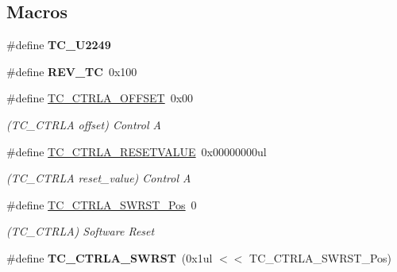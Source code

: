 \subsection*{Macros}
\begin{DoxyCompactItemize}
\item 
\hypertarget{group___s_a_m_l21___t_c_ga7ee2875f18668e775348abb0670dab7c}{}\#define {\bfseries T\+C\+\_\+\+U2249}\label{group___s_a_m_l21___t_c_ga7ee2875f18668e775348abb0670dab7c}

\item 
\hypertarget{group___s_a_m_l21___t_c_gabcc45dcc7fd74357245ffdc3e5c65cda}{}\#define {\bfseries R\+E\+V\+\_\+\+T\+C}~0x100\label{group___s_a_m_l21___t_c_gabcc45dcc7fd74357245ffdc3e5c65cda}

\item 
\hypertarget{group___s_a_m_l21___t_c_ga9eb7017b395a54f7ca9b9da83cc191e7}{}\#define \hyperlink{group___s_a_m_l21___t_c_ga9eb7017b395a54f7ca9b9da83cc191e7}{T\+C\+\_\+\+C\+T\+R\+L\+A\+\_\+\+O\+F\+F\+S\+E\+T}~0x00\label{group___s_a_m_l21___t_c_ga9eb7017b395a54f7ca9b9da83cc191e7}

\begin{DoxyCompactList}\small\item\em (T\+C\+\_\+\+C\+T\+R\+L\+A offset) Control A \end{DoxyCompactList}\item 
\hypertarget{group___s_a_m_l21___t_c_gaadad5111a08d20825cd5413ab481a673}{}\#define \hyperlink{group___s_a_m_l21___t_c_gaadad5111a08d20825cd5413ab481a673}{T\+C\+\_\+\+C\+T\+R\+L\+A\+\_\+\+R\+E\+S\+E\+T\+V\+A\+L\+U\+E}~0x00000000ul\label{group___s_a_m_l21___t_c_gaadad5111a08d20825cd5413ab481a673}

\begin{DoxyCompactList}\small\item\em (T\+C\+\_\+\+C\+T\+R\+L\+A reset\+\_\+value) Control A \end{DoxyCompactList}\item 
\hypertarget{group___s_a_m_l21___t_c_ga0724c3271e5836ea2a22432dd4fb010d}{}\#define \hyperlink{group___s_a_m_l21___t_c_ga0724c3271e5836ea2a22432dd4fb010d}{T\+C\+\_\+\+C\+T\+R\+L\+A\+\_\+\+S\+W\+R\+S\+T\+\_\+\+Pos}~0\label{group___s_a_m_l21___t_c_ga0724c3271e5836ea2a22432dd4fb010d}

\begin{DoxyCompactList}\small\item\em (T\+C\+\_\+\+C\+T\+R\+L\+A) Software Reset \end{DoxyCompactList}\item 
\hypertarget{group___s_a_m_l21___t_c_ga9e0b3aaacef1a3036378af914f41b740}{}\#define {\bfseries T\+C\+\_\+\+C\+T\+R\+L\+A\+\_\+\+S\+W\+R\+S\+T}~(0x1ul $<$$<$ T\+C\+\_\+\+C\+T\+R\+L\+A\+\_\+\+S\+W\+R\+S\+T\+\_\+\+Pos)\label{group___s_a_m_l21___t_c_ga9e0b3aaacef1a3036378af914f41b740}


\end{DoxyCompactItemize}
